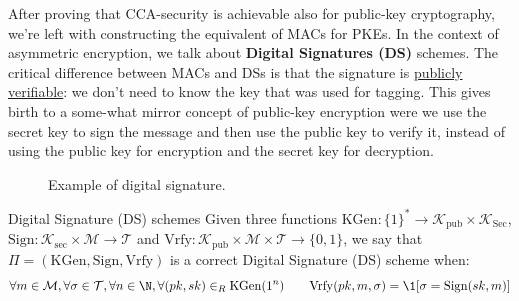 \documentclass[a4paper, 12pt]{report}
\begin{document}
    After proving that CCA-security is achievable also for public-key cryptography, we're left with constructing the equivalent of MACs for PKEs. In the context of asymmetric encryption, we talk about \textbf{Digital Signatures (DS)} schemes. The critical difference between MACs and DSs is that the signature is \underline{publicly verifiable}: we don't need to know the key that was used for tagging. This gives birth to a some-what mirror concept of public-key encryption were we use the secret key to sign the message and then use the public key to verify it, instead of using the public key for encryption and the secret key for decryption.
    
    \begin{figure}[H]
        \centering


        \caption{Example of digital signature.}
    \end{figure}

    \begin{frameddefn}{Digital Signature (DS) schemes}
        Given three functions $\mathrm{KGen} : \{1\}^* \to \mathcal{K}_{\mathrm{pub}} \times \mathcal{K}_\mathrm{Sec}$, $\mathrm{Sign} : \mathcal{K}_{\mathrm{sec}} \times \mathcal{M} \to \mathcal{T}$ and $\mathrm{Vrfy} : \mathcal{K}_{\mathrm{pub}} \times \mathcal{M} \times \mathcal{T} \to \{0,1\}$, we say that $\Pi = (\mathrm{KGen}, \mathrm{Sign}, \mathrm{Vrfy})$ is a correct Digital Signature (DS) scheme when:
        \[\forall m \in \mathcal{M}, \forall \sigma \in \mathcal{T}, \forall n \in \N, \forall (pk,sk) \in_R \mathrm{KGen}(1^n) \qquad \mathrm{Vrfy}(pk, m, \sigma) = \1[\sigma = \mathrm{Sign}(sk, m)]\]
    \end{frameddefn}
\end{document}
